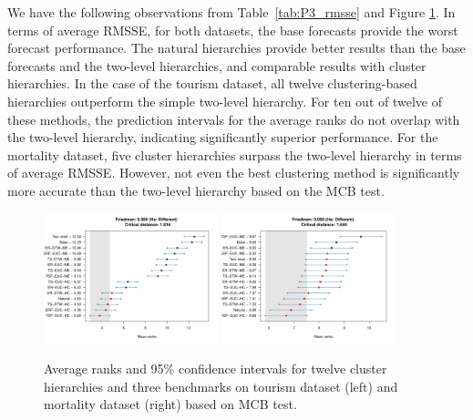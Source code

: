 \documentclass[a4paper,review,12pt,authoryear]{elsarticle}
\begin{document}
We have the following observations from Table~\ref{tab:P3_rmsse} and Figure \ref{fig:P3_mcb_benchmark}. In terms of average RMSSE, for both datasets, the base forecasts provide the worst forecast performance. The natural hierarchies provide better results than the base forecasts and the two-level hierarchies, and comparable results with cluster hierarchies. In the case of the tourism dataset, all twelve clustering-based hierarchies outperform the simple two-level hierarchy. For ten out of twelve of these methods, the prediction intervals for the average ranks do not overlap with the two-level hierarchy, indicating significantly superior performance.
For the mortality dataset, five cluster hierarchies surpass the two-level hierarchy in terms of average RMSSE. However,  not even the best clustering method is significantly more accurate than the two-level hierarchy based on the MCB test. %

\begin{figure}[h!]
    \centering
    \includegraphics[width=0.45\textwidth]{figures/hierarchy_rmsse/tourism/P3_mcb_benchmarks_h12.pdf}
    \includegraphics[width=0.45\textwidth]{figures/hierarchy_rmsse/mortality/P3_mcb_benchmarks_h12.pdf}
    \caption{\label{fig:P3_mcb_benchmark}Average ranks and 95\% confidence intervals for twelve cluster hierarchies and three benchmarks on tourism dataset (left) and mortality dataset (right) based on MCB test.}
\end{figure}
\end{document}
